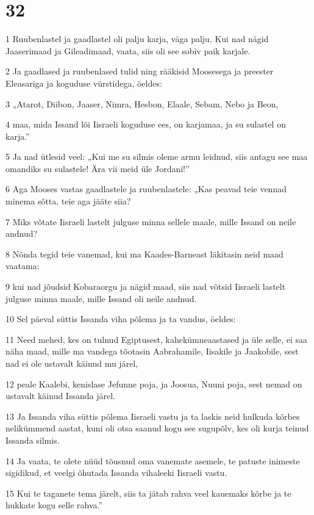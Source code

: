 \chapter{32}

\par 1 Ruubenlastel ja gaadlastel oli palju karja, väga palju. Kui nad nägid Jaaserimaad ja Gileadimaad, vaata, siis oli see sobiv paik karjale.
\par 2 Ja gaadlased ja ruubenlased tulid ning rääkisid Moosesega ja preester Eleasariga ja koguduse vürstidega, öeldes:
\par 3 „Atarot, Diibon, Jaaser, Nimra, Hesbon, Elaale, Sebam, Nebo ja Beon,
\par 4 maa, mida Issand lõi Iisraeli koguduse ees, on karjamaa, ja su sulastel on karja.”
\par 5 Ja nad ütlesid veel: „Kui me su silmis oleme armu leidnud, siis antagu see maa omandiks su sulastele! Ära vii meid üle Jordani!”
\par 6 Aga Mooses vastas gaadlastele ja ruubenlastele: „Kas peavad teie vennad minema sõtta, teie aga jääte siia?
\par 7 Miks võtate Iisraeli lastelt julguse minna sellele maale, mille Issand on neile andnud?
\par 8 Nõnda tegid teie vanemad, kui ma Kaades-Barneast läkitasin neid maad vaatama:
\par 9 kui nad jõudsid Kobaraorgu ja nägid maad, siis nad võtsid Iisraeli lastelt julguse minna maale, mille Issand oli neile andnud.
\par 10 Sel päeval süttis Issanda viha põlema ja ta vandus, öeldes:
\par 11 Need mehed, kes on tulnud Egiptusest, kahekümneaastased ja üle selle, ei saa näha maad, mille ma vandega tõotasin Aabrahamile, Iisakile ja Jaakobile, sest nad ei ole ustavalt käinud mu järel,
\par 12 peale Kaalebi, kenislase Jefunne poja, ja Joosua, Nuuni poja, sest nemad on ustavalt käinud Issanda järel.
\par 13 Ja Issanda viha süttis põlema Iisraeli vastu ja ta laskis neid hulkuda kõrbes nelikümmend aastat, kuni oli otsa saanud kogu see sugupõlv, kes oli kurja teinud Issanda silmis.
\par 14 Ja vaata, te olete nüüd tõusnud oma vanemate asemele, te patuste inimeste sigidikud, et veelgi õhutada Issanda vihaleeki Iisraeli vastu.
\par 15 Kui te taganete tema järelt, siis ta jätab rahva veel kauemaks kõrbe ja te hukkate kogu selle rahva.”
